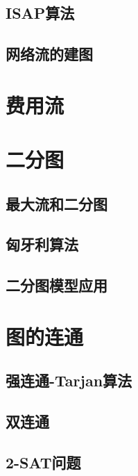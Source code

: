 \documentclass{ctexbook}
\begin{document}

    \subsection{ISAP算法}
    \subsection{网络流的建图}
    \section{费用流}
    \section{二分图}
    \subsection{最大流和二分图}
    \subsection{匈牙利算法}
    \subsection{二分图模型应用}
    \section{图的连通}
    \subsection{强连通-Tarjan算法}
    \subsection{双连通}
    \subsection{2-SAT问题}
\end{document}

